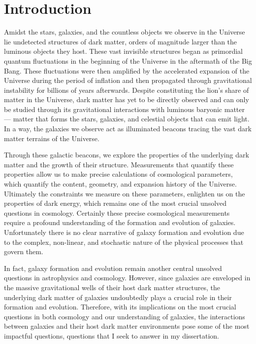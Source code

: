 \chapter*{Introduction}
Amidst the stars, galaxies, and the countless objects we observe in the Universe lie
undetected structures of dark matter, orders of magnitude larger than the luminous objects they
host. These vast invisible structures began as primordial quantum fluctuations in the beginning of
the Universe in the aftermath of the Big Bang. These fluctuations were then amplified by the
accelerated expansion of the Universe during the period of inflation and then propagated through
gravitational instability for billions of years afterwards. Despite constituting the lion’s share of
matter in the Universe, dark matter has yet to be directly observed and can only be studied
through its gravitational interactions with luminous baryonic matter — matter that forms the
stars, galaxies, and celestial objects that can emit light. In a way, the galaxies we observe act as
illuminated beacons tracing the vast dark matter terrains of the Universe.

Through these galactic beacons, we explore the properties of the underlying dark matter
and the growth of their structure. Measurements that quantify these properties allow us to make
precise calculations of cosmological parameters, which quantify the content, geometry, and
expansion history of the Universe. Ultimately the constraints we measure on these parameters,
enlighten us on the properties of dark energy, which remains one of the most crucial unsolved
questions in cosmology. Certainly these precise cosmological measurements require a profound
understanding of the formation and evolution of galaxies. Unfortunately there is no clear
narrative of galaxy formation and evolution due to the complex, non-linear, and stochastic nature
of the physical processes that govern them.

In fact, galaxy formation and evolution remain another central unsolved questions in
astrophysics and cosmology. However, since galaxies are enveloped in the massive gravitational
wells of their host dark matter structures, the underlying dark matter of galaxies undoubtedly
plays a crucial role in their formation and evolution. Therefore, with its implications on the most
crucial questions in both cosmology and our understanding of galaxies, the interactions between
galaxies and their host dark matter environments pose some of the most impactful questions,
questions that I seek to answer in my dissertation. 


